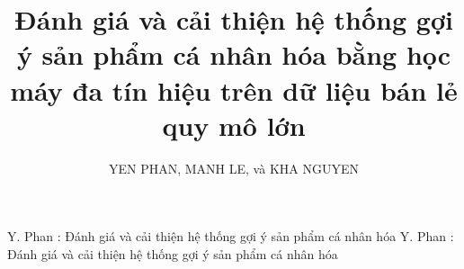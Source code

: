 \documentclass[jtehm]{ieeeaccess}
\begin{document}
\doi{}

\title{Đánh giá và cải thiện hệ thống gợi ý sản phẩm cá nhân hóa bằng học máy đa tín hiệu trên dữ liệu bán lẻ quy mô lớn}

\author{\uppercase{Yen Phan}, \uppercase{Manh Le}, và
\uppercase{Kha Nguyen}}
\address[1]{University of Information Technology, Vietnam National University, Ho Chi Minh City, Vietnam}
\address[*]{Tác giả liên hệ}

\markboth
{Y. Phan \headeretal: Đánh giá và cải thiện hệ thống gợi ý sản phẩm cá nhân hóa}
{Y. Phan \headeretal: Đánh giá và cải thiện hệ thống gợi ý sản phẩm cá nhân hóa}

\end{document}
